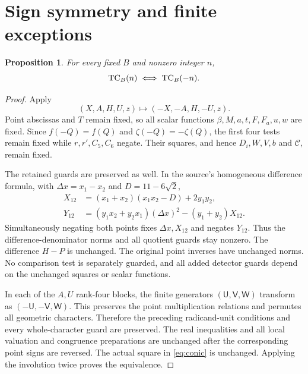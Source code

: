 \documentclass[11pt,a4paper]{article}
\newtheorem{proposition}[theorem]{Proposition}
\begin{document}
\section{Sign symmetry and finite exceptions}

\begin{proposition}\label{prop:sign}
For every fixed $B$ and nonzero integer $n$,
\[
                              \operatorname{TC}_B(n)\iff\operatorname{TC}_B(-n).
\]
\end{proposition}
\begin{proof}
Apply
\begin{equation}\label{eq:sign}
                     (X,A,H,U,z)\longmapsto(-X,-A,H,-U,z).
\end{equation}
Point abscissas and $T$ remain fixed, so all scalar functions
$\beta,M,a,t,F,F_a,u,w$ are fixed. Since $f(-Q)=f(Q)$ and
$\zeta(-Q)=-\zeta(Q)$, the first four tests remain fixed while
$r,r',C_5,C_6$ negate. Their squares, and hence $D_i,W,V,b$ and
$\mathcal C$, remain fixed.

The retained guards are preserved as well. In the source's homogeneous
difference formula, with $\Delta x=x_1-x_2$ and $D=11-6\sqrt2$,
\[
 \begin{aligned}
 X_{12}&=(x_1+x_2)(x_1x_2-D)+2y_1y_2,\\
 Y_{12}&=(y_1x_2+y_2x_1)(\Delta x)^2-(y_1+y_2)X_{12}.
 \end{aligned}
\]
Simultaneously negating both points fixes $\Delta x,X_{12}$ and
negates $Y_{12}$. Thus the difference-denominator norms and all
quotient guards stay nonzero. The difference $H-P$ is unchanged.
The original point inverses have unchanged norms. No comparison
test is separately guarded, and all added detector guards depend
on the unchanged squares or scalar functions.

In each of the $A,U$ rank-four blocks, the finite generators
$(\mathsf U,\mathsf V,\mathsf W)$ transform as
$(-\mathsf U,-\mathsf V,\mathsf W)$. This preserves the point
multiplication relations and permutes all geometric characters.
Therefore the preceding radicand-unit conditions and every
whole-character guard are preserved. The real inequalities and
all local valuation and congruence preparations are unchanged after
the corresponding point signs are reversed. The actual square in
\eqref{eq:conic} is unchanged. Applying the involution twice proves
the equivalence.
\end{proof}
\end{document}
